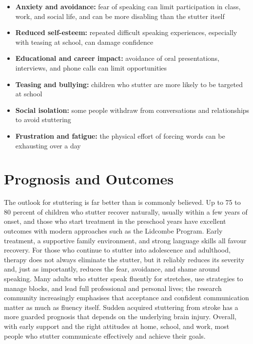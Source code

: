 \begin{itemize}
    \item \textbf{Anxiety and avoidance:} fear of speaking can limit participation in class, work, and social life, and can be more disabling than the stutter itself
    \item \textbf{Reduced self-esteem:} repeated difficult speaking experiences, especially with teasing at school, can damage confidence
    \item \textbf{Educational and career impact:} avoidance of oral presentations, interviews, and phone calls can limit opportunities
    \item \textbf{Teasing and bullying:} children who stutter are more likely to be targeted at school
    \item \textbf{Social isolation:} some people withdraw from conversations and relationships to avoid stuttering
    \item \textbf{Frustration and fatigue:} the physical effort of forcing words can be exhausting over a day
\end{itemize}

\section*{Prognosis and Outcomes}
The outlook for stuttering is far better than is commonly believed. Up to 75 to 80 percent of children who stutter recover naturally, usually within a few years of onset, and those who start treatment in the preschool years have excellent outcomes with modern approaches such as the Lidcombe Program. Early treatment, a supportive family environment, and strong language skills all favour recovery. For those who continue to stutter into adolescence and adulthood, therapy does not always eliminate the stutter, but it reliably reduces its severity and, just as importantly, reduces the fear, avoidance, and shame around speaking. Many adults who stutter speak fluently for stretches, use strategies to manage blocks, and lead full professional and personal lives; the research community increasingly emphasises that acceptance and confident communication matter as much as fluency itself. Sudden acquired stuttering from stroke has a more guarded prognosis that depends on the underlying brain injury. Overall, with early support and the right attitudes at home, school, and work, most people who stutter communicate effectively and achieve their goals.

